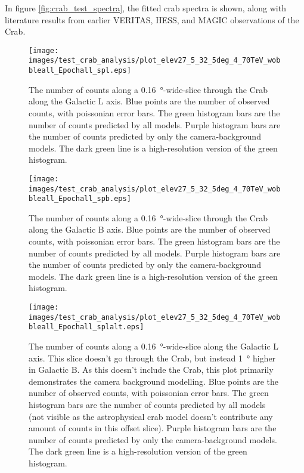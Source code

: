     In figure \ref{fig:crab_test_spectra}, the fitted crab spectra is shown, along with literature results from earlier VERITAS, HESS, and MAGIC observations of the Crab.
    
    \begin{figure}[h]
      \centering
      \texttt{[image: images/test\_crab\_analysis/plot\_elev27\_5\_32\_5deg\_4\_70TeV\_wobbleall\_Epochall\_spl.eps]}
      \caption[Crab Profile along Galactic L]
      {
        The number of counts along a \SI{0.16}{\degree}-wide-slice through the Crab along the Galactic L axis.
        Blue points are the number of observed counts, with poissonian error bars.
        The green histogram bars are the number of counts predicted by all models.
        Purple histogram bars are the number of counts predicted by only the camera-background models.
        The dark green line is a high-resolution version of the green histogram.
      }
      \label{fig:crab_profile_l}
    \end{figure}

    \begin{figure}[h]
      \centering
      \texttt{[image: images/test\_crab\_analysis/plot\_elev27\_5\_32\_5deg\_4\_70TeV\_wobbleall\_Epochall\_spb.eps]}
      \caption[Crab Profile along Galactic B]
      {
        The number of counts along a \SI{0.16}{\degree}-wide-slice through the Crab along the Galactic B axis.
        Blue points are the number of observed counts, with poissonian error bars.
        The green histogram bars are the number of counts predicted by all models.
        Purple histogram bars are the number of counts predicted by only the camera-background models.
        The dark green line is a high-resolution version of the green histogram.
      }
      \label{fig:crab_profile_b}
    \end{figure}
    
    \begin{figure}[h]
      \centering
      \texttt{[image: images/test\_crab\_analysis/plot\_elev27\_5\_32\_5deg\_4\_70TeV\_wobbleall\_Epochall\_splalt.eps]}
      \caption[Crab Profile along Galactic L Off Source]
      {
        The number of counts along a \SI{0.16}{\degree}-wide-slice along the Galactic L axis.
        This slice doesn't go through the Crab, but instead \SI{1}{\degree} higher in Galactic B.
        As this doesn't include the Crab, this plot primarily demonstrates the camera background modelling.
        Blue points are the number of observed counts, with poissonian error bars.
        The green histogram bars are the number of counts predicted by all models (not visible as the astrophysical crab model doesn't contribute any amount of counts in this offset slice).
        Purple histogram bars are the number of counts predicted by only the camera-background models.
        The dark green line is a high-resolution version of the green histogram.
      }
      \label{fig:crab_profile_l_off}
    \end{figure}

